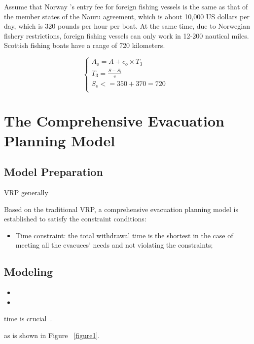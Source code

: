 \documentclass{mcmthesis}
\begin{document}
Assume that Norway ’s entry fee for foreign fishing vessels is the same as that of the member states of the Nauru agreement, which is about 10,000 US dollars per day, which is 320 pounds per hour per boat. At the same time, due to Norwegian fishery restrictions, foreign fishing vessels can only work in 12-200 nautical miles. Scottish fishing boats have a range of 720 kilometers.

\begin{equation}
\left\{
\begin{array}{lr}
A_o=A+c_o \times T_3 &\\
T_3=\frac{S-S_i}{v} &\\
S_o<= 350+370=720 \\
\end{array}
\right.
\end{equation}

\section{The Comprehensive Evacuation Planning Model}
\subsection{Model Preparation}


VRP \cite{Dikas2016Solving,He2015Model} generally 


Based on the traditional VRP, a comprehensive evacuation planning model is established to satisfy the constraint conditions:

\begin{itemize}
  \item Time constraint: the total withdrawal time is the shortest in the case of meeting all the evacuees' needs and not violating the constraints;
\end{itemize}

\subsection{Modeling}

\begin{itemize}

\item 
\item 
\end{itemize}

time is crucial~\cite{Sayyady2010Optimizing,So2010Managing}.



as is shown in Figure ~\ref{figure1}.
\end{document}
